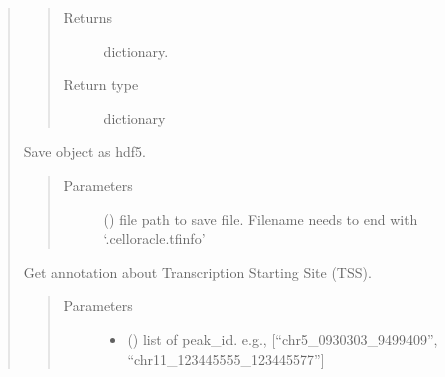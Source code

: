 \documentclass[letterpaper,10pt,english]{sphinxmanual}
\begin{document}
\begin{quote}
\begin{fulllineitems}
\begin{fulllineitems}
\begin{quote}
\begin{description}
\item[{Returns}] \leavevmode
dictionary.

\item[{Return type}] \leavevmode
dictionary

\end{description}\end{quote}

\end{fulllineitems}


\begin{fulllineitems}
\label{\detokenize{modules/celloracle.motif_analysis:celloracle.motif_analysis.TFinfo.to_hdf5}}
Save object as hdf5.
\begin{quote}\begin{description}
\item[{Parameters}] \leavevmode
{} () \textendash{} file path to save file. Filename needs to end with ‘.celloracle.tfinfo’

\end{description}\end{quote}

\end{fulllineitems}


\end{fulllineitems}


\begin{fulllineitems}
\label{\detokenize{modules/celloracle.motif_analysis:celloracle.motif_analysis.get_tss_info}}
Get annotation about Transcription Starting Site (TSS).
\begin{quote}\begin{description}
\item[{Parameters}] \leavevmode\begin{itemize}
\item {} 
 () \textendash{} list of peak\_id. e.g., {[}“chr5\_0930303\_9499409”, “chr11\_123445555\_123445577”{]}


\end{itemize}
\end{description}
\end{quote}
\end{fulllineitems}
\end{quote}
\end{document}
